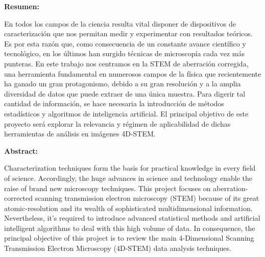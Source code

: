 
\newpage
\thispagestyle{empty} %

{\bfseries \large Resumen:} \vspace{5mm}

En todos los campos de la ciencia resulta vital disponer de dispositivos de caracterización que nos permitan medir y experimentar con resultados teóricos. Es por esta razón que, como consecuencia de un constante avance científico y tecnológico, en los últimos han surgido técnicas de microscopía cada vez más punteras. En este trabajo nos centramos en la STEM de aberración corregida, una herramienta fundamental en numerosos campos de la física que recientemente ha ganado un gran protagonismo, debido a su gran resolución y a la amplia diversidad de datos que puede extraer de una única muestra. Para digerir tal cantidad de información, se hace necesaria la introducción de métodos estadísticos y algoritmos de inteligencia artificial. El principal objetivo de este proyecto será explorar la relevancia y régimen de aplicabilidad de dichas herramientas de análisis en imágenes 4D-STEM.

\vspace{1cm}

{\bfseries \large Abstract: }\vspace{5mm} 

Characterization techniques form the basis for practical knowledge in every field of science. Accordingly, the huge advances in science and technology enable the raise of brand new microscopy techniques. This project focuses on aberration-corrected scanning transmission electron microscopy (STEM) because of its great atomic-resolution and its wealth of sophisticated multidimensional information. Nevertheless, it's required to introduce advanced statistical methods and artificial intelligent algorithms to deal with this high volume of data. In consequence, the principal objective of this project is to review the main 4-Dimensional Scanning Transmission Electron Microscopy (4D-STEM) data analysis techniques.

\vspace{1cm}

